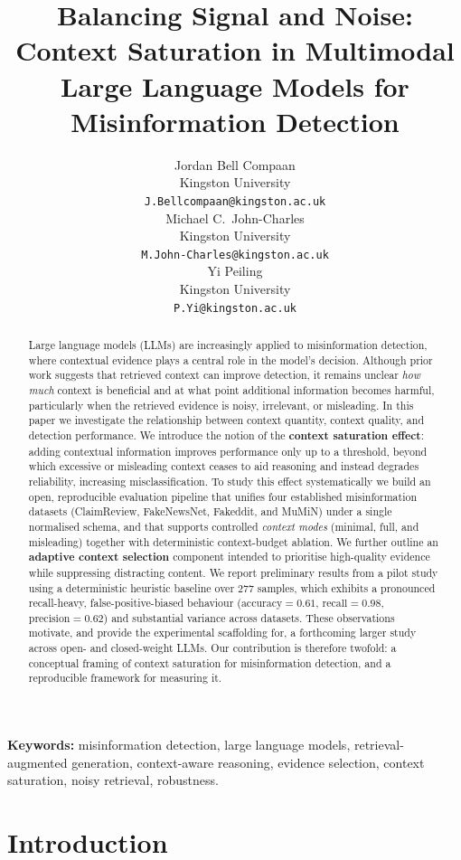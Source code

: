 \documentclass[11pt]{article}
\title{Balancing Signal and Noise: Context Saturation in Multimodal Large Language Models for Misinformation Detection}
\author{Jordan Bell Compaan \\
  Kingston University \\
  \texttt{J.Bellcompaan@kingston.ac.uk} \\\And
  Michael C.\ John-Charles \\
  Kingston University \\
  \texttt{M.John-Charles@kingston.ac.uk} \\\And
  Yi Peiling \\
  Kingston University \\
  \texttt{P.Yi@kingston.ac.uk} \\}
\begin{document}
\maketitle

\begin{abstract}
Large language models (LLMs) are increasingly applied to misinformation detection, where contextual evidence plays a central role in the model's decision. Although prior work suggests that retrieved context can improve detection, it remains unclear \emph{how much} context is beneficial and at what point additional information becomes harmful, particularly when the retrieved evidence is noisy, irrelevant, or misleading. In this paper we investigate the relationship between context quantity, context quality, and detection performance. We introduce the notion of the \textbf{context saturation effect}: adding contextual information improves performance only up to a threshold, beyond which excessive or misleading context ceases to aid reasoning and instead degrades reliability, increasing misclassification. To study this effect systematically we build an open, reproducible evaluation pipeline that unifies four established misinformation datasets (ClaimReview, FakeNewsNet, Fakeddit, and MuMiN) under a single normalised schema, and that supports controlled \emph{context modes} (minimal, full, and misleading) together with deterministic context-budget ablation. We further outline an \textbf{adaptive context selection} component intended to prioritise high-quality evidence while suppressing distracting content. We report preliminary results from a pilot study using a deterministic heuristic baseline over $277$ samples, which exhibits a pronounced recall-heavy, false-positive-biased behaviour ($\text{accuracy}=0.61$, $\text{recall}=0.98$, $\text{precision}=0.62$) and substantial variance across datasets. These observations motivate, and provide the experimental scaffolding for, a forthcoming larger study across open- and closed-weight LLMs. Our contribution is therefore twofold: a conceptual framing of context saturation for misinformation detection, and a reproducible framework for measuring it.
\end{abstract}

\noindent\textbf{Keywords:} misinformation detection, large language models, retrieval-augmented generation, context-aware reasoning, evidence selection, context saturation, noisy retrieval, robustness.

\section{Introduction}
\label{sec:intro}
\end{document}
